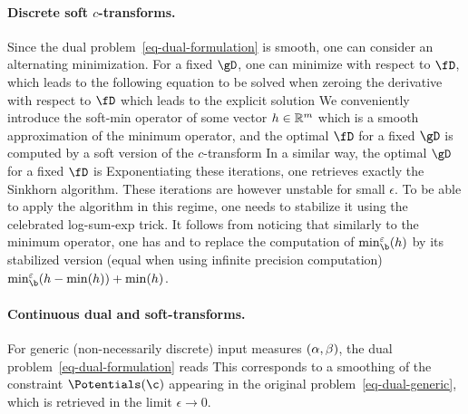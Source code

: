 \paragraph{Discrete soft $c$-transforms.}

Since the dual problem~\eqref{eq-dual-formulation} is smooth, one can consider an alternating minimization. For a fixed $\gD$, one can minimize with respect to $\fD$, which leads to the following equation to be solved when zeroing the derivative with respect to $\fD$ 
which leads to the explicit solution 
We conveniently introduce the soft-min operator of some vector $h \in \mathbb{R}^m$
which is a smooth approximation of the minimum operator, and the optimal $\fD$ for a fixed $\gD$ is computed by a soft version of the $c$-transform
In a similar way, the optimal $\gD$ for a fixed $\fD$ is
Exponentiating these iterations, one retrieves exactly the Sinkhorn algorithm. These iterations are however unstable for small $\epsilon$. To be able to apply the algorithm in this regime, one needs to stabilize it using the celebrated log-sum-exp trick. It follows from noticing that similarly to the minimum operator, one has 
and to replace the computation of ${\min}_{\b}^\epsilon(h)$ by its stabilized version (equal when using infinite precision computation) ${\min}_{\b}^\epsilon(h-\min(h)) +  \min(h)$. 

\paragraph{Continuous dual and soft-transforms.}

For generic (non-necessarily discrete) input measures $(\alpha,\beta)$, the dual problem~\eqref{eq-dual-formulation} reads
This corresponds to a smoothing of the constraint $\Potentials(\c)$ appearing in the original problem~\eqref{eq-dual-generic}, which is retrieved in the limit $\epsilon \rightarrow 0$.

